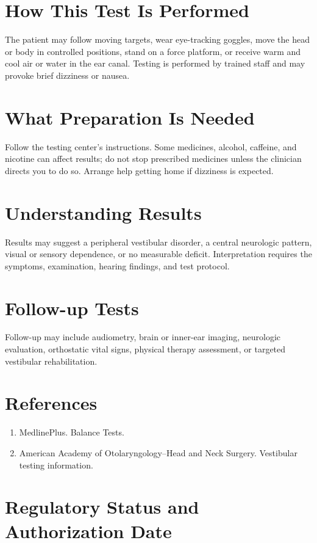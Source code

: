 \section*{How This Test Is Performed}
The patient may follow moving targets, wear eye-tracking goggles, move the head or body in controlled positions, stand on a force platform, or receive warm and cool air or water in the ear canal. Testing is performed by trained staff and may provoke brief dizziness or nausea.

\section*{What Preparation Is Needed}
Follow the testing center's instructions. Some medicines, alcohol, caffeine, and nicotine can affect results; do not stop prescribed medicines unless the clinician directs you to do so. Arrange help getting home if dizziness is expected.

\section*{Understanding Results}
Results may suggest a peripheral vestibular disorder, a central neurologic pattern, visual or sensory dependence, or no measurable deficit. Interpretation requires the symptoms, examination, hearing findings, and test protocol.

\section*{Follow-up Tests}
Follow-up may include audiometry, brain or inner-ear imaging, neurologic evaluation, orthostatic vital signs, physical therapy assessment, or targeted vestibular rehabilitation.

\section*{References}
\begin{enumerate}
  \item MedlinePlus. Balance Tests.
  \item American Academy of Otolaryngology--Head and Neck Surgery. Vestibular testing information.
\end{enumerate}

\clearpage


\section*{Regulatory Status and Authorization Date}

\clearpage
